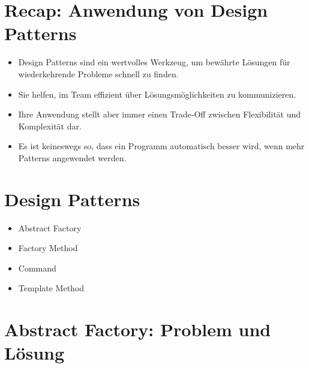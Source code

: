 \documentclass[10pt]{article}
\begin{document}
\section*{Recap: Anwendung von Design Patterns}
\begin{itemize}
  \item Design Patterns sind ein wertvolles Werkzeug, um bewährte Lösungen für wiederkehrende Probleme schnell zu finden.
  \item Sie helfen, im Team effizient über Lösungsmöglichkeiten zu kommunizieren.
  \item Ihre Anwendung stellt aber immer einen Trade-Off zwischen Flexibilität und Komplexität dar.
  \item Es ist keineswegs so, dass ein Programm automatisch besser wird, wenn mehr Patterns angewendet werden.
\end{itemize}

\section*{Design Patterns}
\begin{itemize}
  \item Abstract Factory
  \item Factory Method
  \item Command
  \item Template Method
\end{itemize}

\section*{Abstract Factory: Problem und Lösung}
\end{document}
